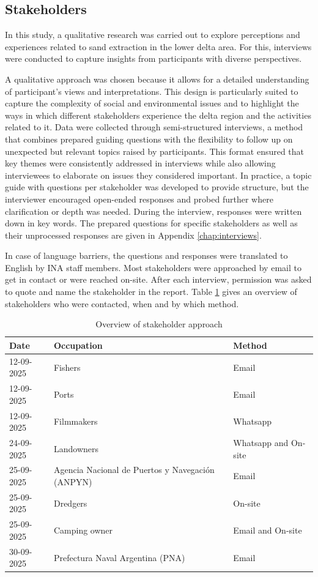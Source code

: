 \subsection{Stakeholders}
\label{sec:stakeholder methods}
In this study, a qualitative research was carried out to explore perceptions and experiences related to sand extraction in the lower delta area. For this, interviews were conducted to capture insights from participants with diverse perspectives.

A qualitative approach was chosen because it allows for a detailed understanding of participant's views and interpretations. This design is particularly suited to capture the complexity of social and environmental issues and to highlight the ways in which different stakeholders experience the delta region and the activities related to it. Data were collected through semi-structured interviews, a method that combines prepared guiding questions with the flexibility to follow up on unexpected but relevant topics raised by participants. This format ensured that key themes were consistently addressed in interviews while also allowing interviewees to elaborate on issues they considered important. In practice, a topic guide with questions per stakeholder was developed to provide structure, but the interviewer encouraged open-ended responses and probed further where clarification or depth was needed. During the interview, responses were written down in key words. The prepared questions for specific stakeholders as well as their unprocessed responses are given in Appendix \ref{chap:interviews}.

In case of language barriers, the questions and responses were translated to English by INA staff members. Most stakeholders were approached by email to get in contact or were reached on-site. After each interview, permission was asked to quote and name the stakeholder in the report. Table \ref{tab:stakeholders} gives an overview of stakeholders who were contacted, when and by which method. 

\begin{table}[H]
    \centering
    \begin{tabularx}{\textwidth}{l l l}
        \toprule
        Date & Occupation & Method \\
        \midrule
        12-09-2025 & Fishers & Email \\
        12-09-2025 & Ports & Email \\
        12-09-2025 & Filmmakers & Whatsapp \\
        24-09-2025 & Landowners & Whatsapp and On-site \\
        25-09-2025 & Agencia Nacional de Puertos y Navegación (ANPYN) &  Email \\
        25-09-2025 & Dredgers & On-site \\
        25-09-2025 & Camping owner & Email and On-site \\
        30-09-2025 & Prefectura Naval Argentina (PNA) & Email \\
        \bottomrule
    \end{tabularx}
    \caption{Overview of stakeholder approach}
    \label{tab:stakeholders}
\end{table}

